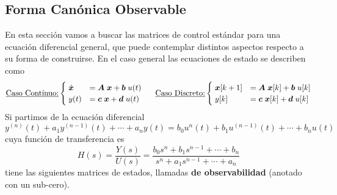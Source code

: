 \subsection{Forma Canónica Observable}
En esta sección vamos a buscar las matrices de control estándar para una ecuación
diferencial general, que puede contemplar distintos aspectos respecto a su forma de construirse. 
En el caso general las ecuaciones de estado se describen como
\begin{equation}
    \text{\underline{Caso Contínuo:}}
    \begin{cases}
        \; \dot{\bm{x}} &= \bm{A} \; \bm{x} + \bm{b} \; u(t) \\
        \; y(t) &= \bm{c} \;\bm{x} + \bm{d} \; u(t) \\
    \end{cases}%
    \hspace*{15pt}
    \text{\underline{Caso Discreto:}}    
    \begin{cases}
        \; \bm{x}[k+1] &= \bm{A} \; \bm{x}[k] + \bm{b} \; u[k] \\
        \; y[k] &= \bm{c} \;\bm{x}[k] + \bm{d} \; u[k] \\
    \end{cases}
\end{equation}
Si partimos de la ecuación diferencial
\begin{equation*}
    y^{(n)}(t) + a_1 y^{(n-1)}(t) + \cdots + a_n y(t) = b_0 u^{n}(t) + b_1 u^{(n-1)}(t) + \cdots + b_n u(t)
\end{equation*}
cuya función de transferencia es
\begin{equation*}
    H(s) = \dfrac{Y(s)}{U(s)} = \dfrac{b_0 s^n + b_1 s^{n-1} + \cdots + b_n}{s^n + a_1 s^{n-1} + \cdots + a_n}
\end{equation*}
tiene las siguientes matrices de estados, llamadas \textbf{de observabilidad} (anotado con un sub-cero).
